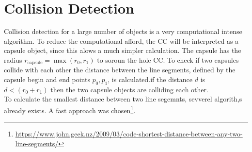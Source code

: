 \section{Collision Detection}
% 
Collision detection for a large number of objects is a very computational intense algorithm.
To reduce the computational afford, the \ac{CC} will be interpreted as a capsule object, since this alows a much simpler calculation.
The capsule has the radius $r_{\text{capsule}} = \max(r_0, r_1)$ to soroun the hole \ac{CC}.
To check if two capsules collide with each other the distance between the line segments, defined by the capsule begin and end points $p_0, p_1$, is calculated.if the distance $d$ is $d < (r_0 + r_1)$ then the two capsule objects are colliding each other. \\
% 
To calculate the smallest distance between two line segemnts, sevverel algorith,s already exists.
A fast approach was chosen\footnote{\href{https://www.john.geek.nz/2009/03/code-shortest-distance-between-any-two-line-segments/}{https://www.john.geek.nz/2009/03/code-shortest-distance-between-any-two-line-segments/}}.
%
